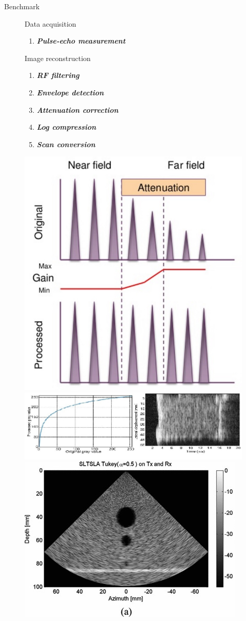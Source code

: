 \documentclass[t,12pt,english
\ifx\beamermode\undefined\else,\beamermode\fi
]{beamer}
\begin{document}
\begin{frame}{Benchmark}


\begin{figure}[!htb]

\begin{block}{\footnotesize{Data acquisition}}\tiny{}
\begin{enumerate} 
\vspace{0.05cm}
    
     \item \tiny{\textbf{\textit{Pulse-echo measurement}}}
\end{enumerate}
\end{block}

\begin{block}{\footnotesize{Image reconstruction}}\tiny{}
\begin{enumerate} 
\vspace{0.05cm}
     \color{red}
     \item \tiny{\textbf{\textit{RF filtering}}}
     \item \tiny{\textbf{\textit{Envelope detection}}}
     \item \tiny{\textbf{\textit{Attenuation correction}}}
     \item \tiny{\textbf{\textit{Log compression}}}
     \item \tiny{\textbf{\textit{Scan conversion}}}
\end{enumerate}
\end{block}
\endminipage
{}
\centering
\includegraphics[width=.31\textwidth]{8.jpg}\\
\includegraphics[width=.31\textwidth]{6.jpg}\\
\includegraphics[width=.31\textwidth]{28.jpg}\\

\endminipage


\end{figure}

\end{frame}
\end{document}
